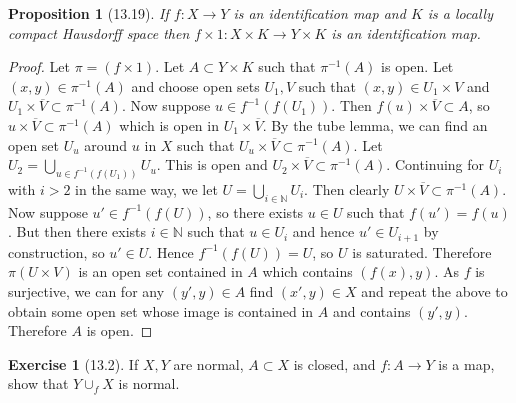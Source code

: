 \documentclass[reqno]{amsart}
\theoremstyle{plain}%
\newtheorem{proposition}[theorem]{Proposition}
\theoremstyle{definition}
\newtheorem{exercise}[theorem]{Exercise}
\theoremstyle{remark}
\begin{document}
    \begin{proposition}[13.19]
        If $f  \colon X \to Y$ is an identification map and $K$ is
        a locally compact Hausdorff space then $f\times 1  \colon
        X \times K \to Y \times K$ is an identification map.
    \end{proposition}

    \begin{proof}
        Let $\pi = \left( f \times 1 \right) $.
        Let $A \subset Y \times K$ such that $\pi^{-1}(A) $ is open.
        Let $\left( x,y \right) \in \pi^{-1}(A)$ and choose open sets
         $U_1,V$ such that $\left( x,y \right) \in U_1 \times V$
         and $U_1 \times \overline{V} \subset \pi^{-1}(A)$.
         Now suppose $u \in f^{-1}\left( f \left( U_1 \right)  \right) $. Then
         $f(u) \times \overline{V} \subset A$, so
         $u \times \overline{V} \subset  \pi^{-1}(A)$ which is open in
         $U_1 \times \overline{V}$. By the tube lemma, we can find
         an open set $U_u$ around $u$ in $X$ such that
         $U_u \times \overline{V} \subset \pi^{-1}(A)$. 
         Let $U_2 = \bigcup_{u \in f^{-1}\left( f(U_1) \right) } U_u$. This is
         open and $U_2 \times \overline{V} \subset \pi^{-1}(A)$. Continuing
         for $U_i$ with $i>2 $ in the same way, we let
         $U = \bigcup_{i \in \mathbb{N}} U_i$. Then
         clearly $U \times \overline{V} \subset \pi^{-1}(A)$.\\
         Now suppose $u' \in f^{-1}\left( f(U) \right) $, so
         there exists $u \in U$ such that $f(u') = f(u)$. But then
         there exists  $i \in \mathbb{N}$ such that
         $u \in U_i$ and hence $u' \in U_{i+1}$ by construction, so
         $u' \in U$. Hence $f^{-1}\left( f\left( U \right)  \right) = U$, so
         $U$ is saturated. Therefore
         $\pi \left( U \times V \right) $ is an open set contained in $A$ which
         contains $\left( f(x), y \right) $. As $f$ is surjective,
         we can for any $(y',y) \in A$ find $(x',y) \in X$ and repeat the above
         to obtain some open set whose image is contained in $A$ and contains 
         $\left( y',y \right) $. Therefore $A$ is open.
     \end{proof}

     \begin{exercise}[13.2]
         If $X,Y$ are normal, $A \subset X$ is closed, and $f  \colon A \to Y$ 
         is a map, show that $Y \cup_f X$ is normal.
     \end{exercise}
\end{document}
